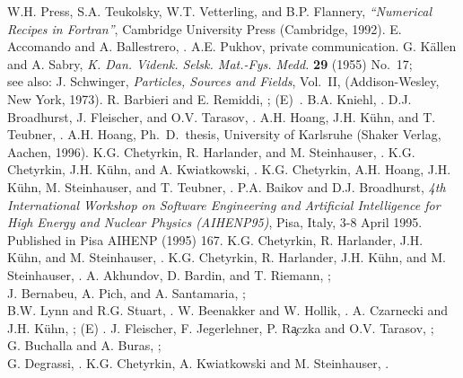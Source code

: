   W.H. Press, S.A. Teukolsky, W.T. Vetterling, and B.P. Flannery,
  {\it ``Numerical Recipes in Fortran''}, Cambridge University Press
  (Cambridge, 1992).
 E. Accomando and A. Ballestrero, .
  A.E. Pukhov, private communication.
 G. K\"allen and A. Sabry, {\it
    K. Dan. Videnk. Selsk. Mat.-Fys. Medd.} {\bf 29} (1955) No.~17;\\
  see also:
  J. Schwinger, {\it Particles, Sources and Fields}, Vol.~II,
  (Addison-Wesley, New York, 1973).
  R. Barbieri and E. Remiddi, ; (E)~.
  B.A. Kniehl, .
  D.J. Broadhurst, J. Fleischer, and O.V. Tarasov, .
  A.H. Hoang, J.H. K\"uhn, and T. Teubner, .
 A.H. Hoang, Ph.~D.~thesis, University of Karlsruhe
  (Shaker Verlag, Aachen, 1996).
 K.G. Chetyrkin, R. Harlander, and M. Steinhauser,
  .
  K.G. Chetyrkin, J.H. K\"uhn, and A. Kwiatkowski, .
  K.G. Chetyrkin, A.H. Hoang, J.H. K\"uhn, M. Steinhauser, and T. Teubner,
  .
  P.A. Baikov and D.J. Broadhurst,
  {\it 4th International Workshop on Software Engineering and
  Artificial Intelligence for High Energy and Nuclear Physics (AIHENP95)},
  Pisa, Italy, 3-8 April 1995.
  Published in Pisa AIHENP (1995) 167.
  K.G. Chetyrkin, R. Harlander, J.H. K\"uhn, and
  M. Steinhauser, .
  K.G. Chetyrkin, R. Harlander, J.H. K\"uhn, and M. Steinhauser,
  .
  A. Akhundov, D. Bardin, and T. Riemann, ;\\
  J. Bernabeu, A. Pich, and A. Santamaria, ;\\
  B.W. Lynn and R.G. Stuart, .
  W. Beenakker and W. Hollik, .
  A. Czarnecki and J.H. K\"uhn, ; 
  (E) .
  J. Fleischer, F. Jegerlehner, P. R\c{a}czka and O.V. Tarasov,
  ;\\
  G. Buchalla and A. Buras, ;\\
  G. Degrassi, .
  K.G. Chetyrkin, A. Kwiatkowski and M. Steinhauser, .
